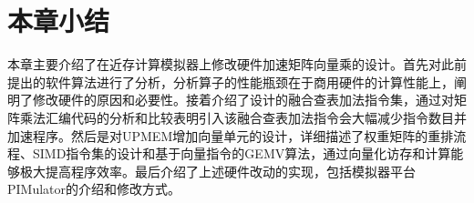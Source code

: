 \section{本章小结}
本章主要介绍了在近存计算模拟器上修改硬件加速矩阵向量乘的设计。首先对此前提出的软件算法进行了分析，分析算子的性能瓶颈在于商用硬件的计算性能上，阐明了修改硬件的原因和必要性。接着介绍了设计的融合查表加法指令集，通过对矩阵乘法汇编代码的分析和比较表明引入该融合查表加法指令会大幅减少指令数目并加速程序。然后是对UPMEM增加向量单元的设计，详细描述了权重矩阵的重排流程、SIMD指令集的设计和基于向量指令的GEMV算法，通过向量化访存和计算能够极大提高程序效率。最后介绍了上述硬件改动的实现，包括模拟器平台PIMulator的介绍和修改方式。